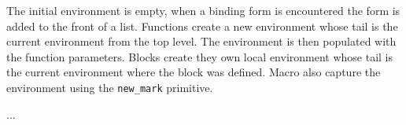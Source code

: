 \documentclass[12pt,english,letterpaper]{article}
\begin{document}
The initial environment is empty, when a binding form is encountered
the form is added to the front of a list.  Functions create a new
environment whose tail is the current environment from the top level.
The environment is then populated with the function parameters.
Blocks create they own local environment whose tail is the current
environment where the block was defined.  Macro also capture the
environment using the \verb/new_mark/ primitive.

...











\end{document}
